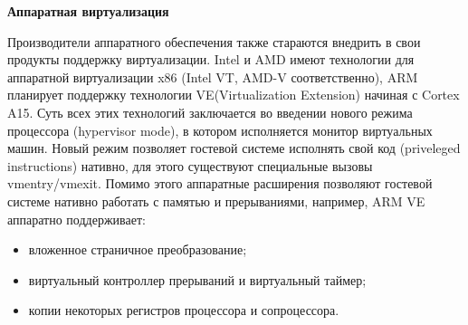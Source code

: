 \textbf{Аппаратная виртуализация}

Производители аппаратного обеспечения также стараются внедрить в свои продукты поддержку виртуализации. Intel и AMD имеют технологии для аппаратной виртуализации x86 (Intel VT, AMD-V соответственно), ARM планирует поддержку технологии VE(Virtualization Extension) начиная с Cortex A15. Суть всех этих технологий заключается во введении нового режима процессора (hypervisor mode), в котором исполняется монитор виртуальных машин. Новый режим позволяет гостевой системе исполнять свой код (priveleged instructions) нативно, для этого существуют специальные вызовы vmentry/vmexit\cite{bib:vmware_technique}. Помимо этого аппаратные расширения позволяют гостевой системе нативно работать с памятью и прерываниями, например, ARM VE аппаратно поддерживает:

\begin{itemize}
    \item вложенное страничное преобразование;
    \item виртуальный контроллер прерываний и виртуальный таймер;
    \item копии некоторых регистров процессора и сопроцессора.
\end{itemize}
